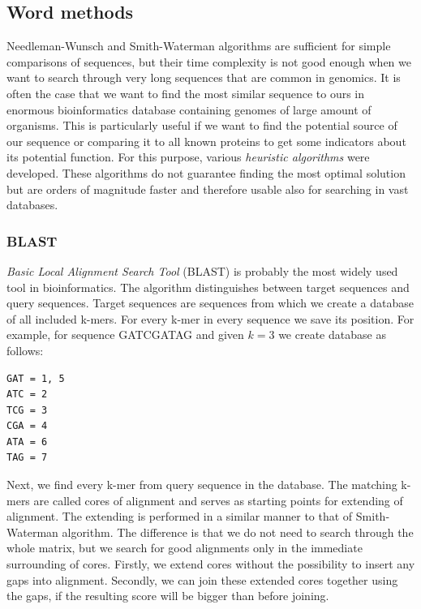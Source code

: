\subsection{Word methods}
Needleman-Wunsch and Smith-Waterman algorithms are sufficient for simple comparisons of sequences, but their time complexity is not good enough when we want to search through very long sequences that are common in genomics.
It is often the case that we want to find the most similar sequence to ours in enormous bioinformatics database containing genomes of large amount of organisms.
This is particularly useful if we want to find the potential source of our sequence or comparing it to all known proteins to get some indicators about its potential function.
For this purpose, various \emph{heuristic algorithms} were developed.
These algorithms do not guarantee finding the most optimal solution but are orders of magnitude faster and therefore usable also for searching in vast databases.

\subsubsection{BLAST}
\emph{Basic Local Alignment Search Tool} (BLAST) \cite{blast} is probably the most widely used tool in bioinformatics.
The algorithm distinguishes between target sequences and query sequences.
Target sequences are sequences from which we create a database of all included k-mers.
For every k-mer in every sequence we save its position.
For example, for sequence GATCGATAG and given $k=3$ we create database as follows:
\begin{verbatim}
GAT = 1, 5
ATC = 2
TCG = 3
CGA = 4
ATA = 6
TAG = 7
\end{verbatim}
Next, we find every k-mer from query sequence in the database.
The matching k-mers are called cores of alignment and serves as starting points for extending of alignment.
The extending is performed in a similar manner to that of Smith-Waterman algorithm.
The difference is that we do not need to search through the whole matrix, but we search for good alignments only in the immediate surrounding of cores.
Firstly, we extend cores without the possibility to insert any gaps into alignment.
Secondly, we can join these extended cores together using the gaps, if the resulting score will be bigger than before joining.

